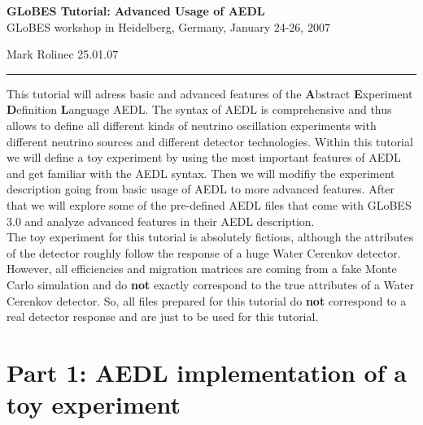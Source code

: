 \documentclass[12pt,a4paper]{article}
\theoremstyle{dotless}
\begin{document}
\vspace*{-3cm}
\begin{center}
{\large\bf GLoBES Tutorial: Advanced Usage of AEDL}\\ [0.3cm]
GLoBES workshop in Heidelberg, Germany, January 24-26, 2007
\end{center}
\vspace*{2mm}

Mark Rolinec \hfill 25.01.07

\bigskip
\hrule
\vspace*{4mm}

{\small
This tutorial will adress basic and advanced features of the {\bf A}bstract 
{\bf E}xperiment {\bf D}efinition {\bf L}anguage AEDL. The syntax of AEDL is
comprehensive and thus allows to define all different kinds of neutrino 
oscillation experiments with different neutrino sources and different detector
technologies. Within this tutorial we will define a toy experiment by using 
the most important features of AEDL and get familiar with the AEDL syntax.
Then we will modifiy the experiment description going from basic usage of AEDL
to more advanced features. After that we will explore some of the pre-defined
AEDL files that come with GLoBES 3.0 and analyze advanced features in their AEDL
description. \\

The toy experiment for this tutorial is absolutely fictious, although the attributes 
of the detector roughly follow the response of a huge Water Cerenkov detector.
However, all efficiencies and migration matrices are coming from a fake 
Monte Carlo simulation and do {\bf not} exactly correspond to the true 
attributes of a Water Cerenkov detector. So, all files prepared for this tutorial 
do {\bf not} correspond to a real detector response and are just to 
be used for this tutorial.  
}


\section*{Part 1: AEDL implementation of a toy experiment}
\end{document}
